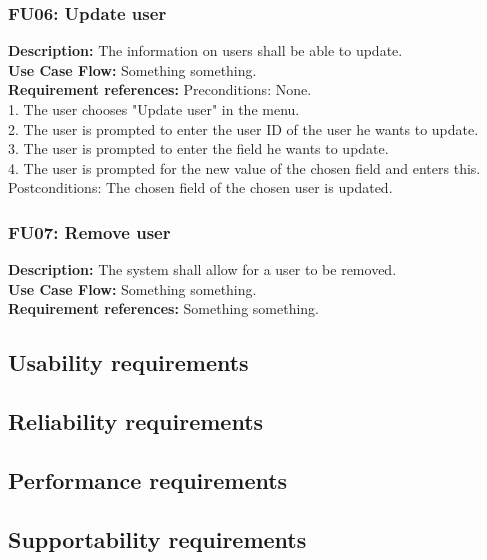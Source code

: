 \begin{adjustwidth}{2em}{0pt}
    \subsubsection*{FU06: Update user}
    \begin{adjustwidth}{1em}{0pt}
        \textbf{Description:}
        The information on users shall be able to update.\\
        \textbf{Use Case Flow:}
        Something something.\\
        \textbf{Requirement references:}
        Preconditions: None.\\
        1. The user chooses "Update user" in the menu.\\
        2. The user is prompted to enter the user ID of the user he wants to update.\\
        3. The user is prompted to enter the field he wants to update.\\
        4. The user is prompted for the new value of the chosen field and enters this.\\
        Postconditions: The chosen field of the chosen user is updated.\\
    \end{adjustwidth}
    
    \subsubsection*{FU07: Remove user}
    \begin{adjustwidth}{1em}{0pt}
        \textbf{Description:}
        The system shall allow for a user to be removed.\\
        \textbf{Use Case Flow:}
        Something something.\\
        \textbf{Requirement references:}
        Something something.
    \end{adjustwidth}
\end{adjustwidth}

\subsection*{Usability requirements}


\subsection*{Reliability requirements}


\subsection*{Performance requirements}


\subsection*{Supportability requirements}


